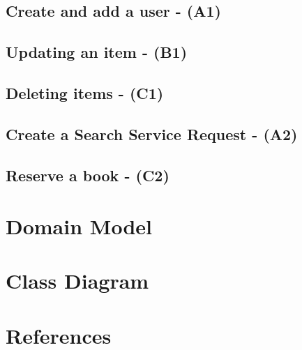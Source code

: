 \documentclass{article}
\begin{document}
\subsection{Create and add a user - (A1)}


\subsection{Updating an item - (B1)}



\subsection{Deleting items - (C1)}


\subsection{Create a Search Service Request - (A2)}



\subsection{Reserve a book - (C2)}


\section{Domain Model}

\section{Class Diagram}
\section{References}
\end{document}
